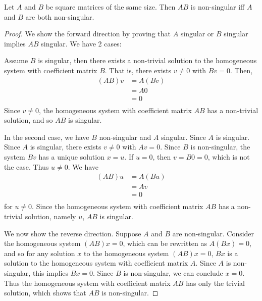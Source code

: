 \documentclass{article}
\begin{document}
\begin{theorem}
  Let $A$ and $B$ be square matrices of the same size. Then $AB$ is non-singular iff $A$ and $B$ are both non-singular.
\end{theorem}
\begin{proof}
  We show the forward direction by proving that $A$ singular or $B$ singular implies $AB$ singular. We have 2 cases:

  Assume $B$ is singular, then there exists a non-trivial solution to the homogeneous system with coefficient matrix $B$. That is, there exists $v \not = 0$ with $Bv = 0$. Then,
  \begin{align*}
    (AB)v &= A(Bv)\\
    &= A0\\
    &= 0\\
  \end{align*}
  Since $v \not = 0$, the homogeneous system with coefficient matrix $AB$ has a non-trivial solution, and so $AB$ is singular.

  In the second case, we have $B$ non-singular and $A$ singular. Since $A$ is singular. Since $A$ is singular, there exists $v \not = 0$ with $Av = 0$. Since $B$ is non-singular, the system $Bv$ has a unique solution $x=u$. If $u = 0$, then $v = B0 = 0$, which is not the case. Thus $u \not = 0$. We have
  \begin{align*}
    (AB)u &= A(Bu)\\
    &= Av\\
    &= 0\\
  \end{align*}
  for $u \not = 0$. Since the homogeneous system with coefficient matrix $AB$ has a non-trivial solution, namely $u$, $AB$ is singular.

  We now show the reverse direction. Suppose $A$ and $B$ are non-singular. Consider the homogeneous system $(AB)x=0$, which can be rewritten as $A(Bx) = 0$, and so for any solution $x$ to the homogeneous system $(AB)x = 0$, $Bx$ is a solution to the homogeneous system with coefficient matrix $A$. Since $A$ is non-singular, this implies $Bx = 0$. Since $B$ is non-singular, we can conclude $x = 0$. Thus the homogeneous system with coefficient matrix $AB$ has only the trivial solution, which shows that $AB$ is non-singular.
\end{proof}
\end{document}
